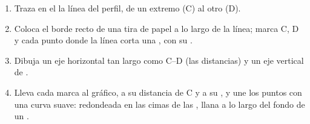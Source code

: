\begin{method}
\begin{enumerate}
  \item Traza en el  la línea del perfil, de un extremo (C) al otro
        (D).
  \item Coloca el borde recto de una tira de papel a lo largo de la línea;
        marca C, D y cada punto donde la línea corta una , con
        su .
  \item Dibuja un eje horizontal tan largo como C--D (las distancias) y un
        eje vertical de .
  \item Lleva cada marca al gráfico, a su distancia de C y a su , y
        une los puntos con una curva suave: redondeada en las cimas de las
        , llana a lo largo del fondo de un .
\end{enumerate}
\end{method}

